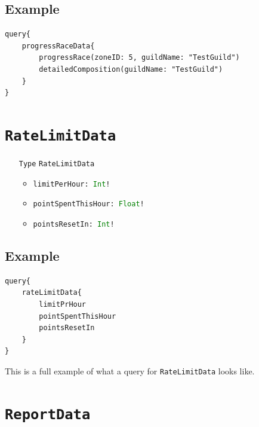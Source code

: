 \documentclass[10pt, a4paper]{memoir}
\numberwithin{equation}{section}
\theoremstyle{plain}
\theoremstyle{defp}
\theoremstyle{dotless}
\theoremstyle{definition}
\theoremstyle{dotless}
\theoremstyle{dotless}
\theoremstyle{defp}
\theoremstyle{defp}
\theoremstyle{be}          %
\theoremstyle{defp}
\newcommand\ttt[1]{\texttt{#1}}
\newcommand\type[1]{\ttt{\textcolor{green}{#1}}}
\begin{document}
\subsection{Example}

\begin{lstlisting}[language=WowAPI]
query{
	progressRaceData{
		progressRace(zoneID: 5, guildName: "TestGuild")
		detailedComposition(guildName: "TestGuild")
	}
}
\end{lstlisting}

\newpage




\section{\ttt{RateLimitData}}\label{sec:RateLimitData}

\begin{itemize}[noitemsep,topsep=1pt]
\item[\ttt{Type}] \ttt{RateLimitData}
\begin{itemize}[itemsep=1pt,topsep=1pt]
\item \ttt{limitPerHour: \type{Int}!}
\item \ttt{pointSpentThisHour: \type{Float}!}
\item \ttt{pointsResetIn: \type{Int}!}
\end{itemize}
\end{itemize}

\subsection{Example}

\begin{lstlisting}[language=WowAPI]
query{
	rateLimitData{
		limitPrHour
		pointSpentThisHour
		pointsResetIn
	}
}
\end{lstlisting}

This is a full example of what a query for \ttt{RateLimitData} looks like. 

\newpage




\section{\ttt{ReportData}}\label{sec:ReportData}
\end{document}

